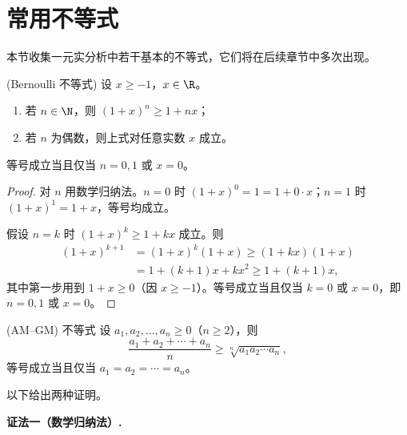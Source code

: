 \section{常用不等式}

本节收集一元实分析中若干基本的不等式，它们将在后续章节中多次出现。

\begin{proposition}(Bernoulli 不等式)
	设 $x \geqslant -1$，$x \in \R$。
	\begin{enumerate}
		\item 若 $n \in \N$，则 $(1+x)^n \geqslant 1 + nx$；
		\item 若 $n$ 为偶数，则上式对任意实数 $x$ 成立。
	\end{enumerate}
	等号成立当且仅当 $n = 0,1$ 或 $x = 0$。
\end{proposition}

\begin{proof}
	对 $n$ 用数学归纳法。$n=0$ 时 $(1+x)^0 = 1 = 1+0\cdot x$；$n=1$ 时 $(1+x)^1 = 1+x$，等号均成立。
	
	假设 $n=k$ 时 $(1+x)^k \geqslant 1+kx$ 成立。则
	\[
	\begin{aligned}
	(1+x)^{k+1} &= (1+x)^k(1+x) \geqslant (1+kx)(1+x) \\
	&= 1 + (k+1)x + kx^2 \geqslant 1 + (k+1)x,
	\end{aligned}
	\]
	其中第一步用到 $1+x \geqslant 0$（因 $x \geqslant -1$）。等号成立当且仅当 $k=0$ 或 $x=0$，即 $n=0,1$ 或 $x=0$。
\end{proof}



\begin{proposition}(AM--GM) 不等式
	设 $a_1, a_2, \dots, a_n \geqslant 0$（$n \geqslant 2$），则
	\[
	\frac{a_1 + a_2 + \cdots + a_n}{n} \geqslant \sqrt[n]{a_1 a_2 \cdots a_n},
	\]
	等号成立当且仅当 $a_1 = a_2 = \cdots = a_n$。
\end{proposition}

以下给出两种证明。

\medskip
\noindent\textbf{证法一（数学归纳法）.}

